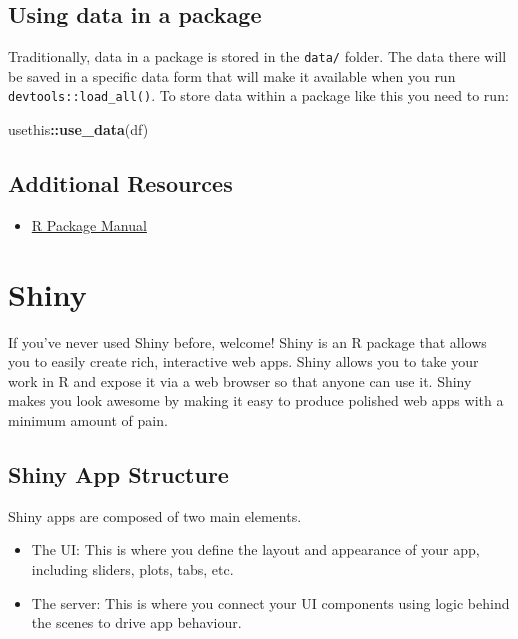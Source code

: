 \documentclass[
]{book}
\newenvironment{Shaded}{\begin{snugshade}}{\end{snugshade}}
\newcommand{\KeywordTok}[1]{\textcolor[rgb]{0.13,0.29,0.53}{\textbf{#1}}}
\newcommand{\NormalTok}[1]{#1}
\newcommand{\OperatorTok}[1]{\textcolor[rgb]{0.81,0.36,0.00}{\textbf{#1}}}
\providecommand{\tightlist}{%
  \setlength{\itemsep}{0pt}\setlength{\parskip}{0pt}}
\begin{document}
\hypertarget{pkg-data}{%
\section{Using data in a package}\label{pkg-data}}

Traditionally, data in a package is stored in the \texttt{data/} folder. The data there will be saved in a specific data form that will make it available when you run \texttt{devtools::load\_all()}. To store data within a package like this you need to run:

\begin{Shaded}
\begin{Highlighting}[]
\NormalTok{usethis}\OperatorTok{::}\KeywordTok{use_data}\NormalTok{(df)}
\end{Highlighting}
\end{Shaded}

\hypertarget{additional-resources-1}{%
\section{Additional Resources}\label{additional-resources-1}}

\begin{itemize}
\tightlist
\item
  \href{https://r-pkgs.org/}{R Package Manual}
\end{itemize}

\hypertarget{shiny}{%
\chapter{Shiny}\label{shiny}}

If you've never used Shiny before, welcome! Shiny is an R package that allows you to easily create rich, interactive web apps. Shiny allows you to take your work in R and expose it via a web browser so that anyone can use it. Shiny makes you look awesome by making it easy to produce polished web apps with a minimum amount of pain.

\hypertarget{shiny-app-structure}{%
\section{Shiny App Structure}\label{shiny-app-structure}}

Shiny apps are composed of two main elements.

\begin{itemize}
\tightlist
\item
  The UI: This is where you define the layout and appearance of your app, including sliders, plots, tabs, etc.
\item
  The server: This is where you connect your UI components using logic behind the scenes to drive app behaviour.
\end{itemize}
\end{document}
